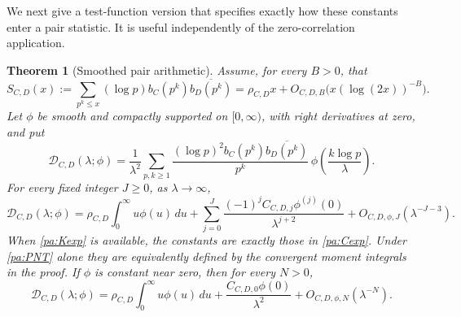 \documentclass[11pt,reqno]{amsart}
\numberwithin{equation}{section}
\newtheorem{theorem}{Theorem}[section]
\theoremstyle{definition}
\theoremstyle{remark}
\begin{document}
We next give a test-function version that specifies exactly how these constants enter a pair statistic. It is useful independently of the zero-correlation application.

\begin{theorem}[Smoothed pair arithmetic]\label{pa:smooth}
Assume, for every $B>0$, that
\begin{equation}S_{C,D}(x):=\sum_{p^k\le x}(\log p)b_C(p^k)\overline{b_D(p^k)}
=\rho_{C,D}x+O_{C,D,B}\bigl(x(\log(2x))^{-B}\bigr).\label{pa:PNT}\end{equation}
Let $\phi$ be smooth and compactly supported on $[0,\infty)$, with right derivatives at zero, and put
\begin{equation}\mathcal D_{C,D}(\lambda;\phi)=\frac1{\lambda^2}\sum_{p,k\ge1}
\frac{(\log p)^2b_C(p^k)\overline{b_D(p^k)}}{p^k}\,
\phi\left(\frac{k\log p}{\lambda}\right).\label{pa:D}\end{equation}
For every fixed integer $J\ge0$, as $\lambda\to\infty$,
\begin{equation}\mathcal D_{C,D}(\lambda;\phi)
=\rho_{C,D}\int_0^\infty u\phi(u)\,du+
\sum_{j=0}^{J}\frac{(-1)^j C_{C,D,j}\phi^{(j)}(0)}{\lambda^{j+2}}
+O_{C,D,\phi,J}(\lambda^{-J-3}).\label{pa:Dexp}\end{equation}
When \eqref{pa:Kexp} is available, the constants are exactly those in \eqref{pa:Cexp}. Under \eqref{pa:PNT} alone they are equivalently defined by the convergent moment integrals in the proof. If $\phi$ is constant near zero, then for every $N>0$,
\begin{equation}\mathcal D_{C,D}(\lambda;\phi)
=\rho_{C,D}\int_0^\infty u\phi(u)\,du+
\frac{C_{C,D,0}\phi(0)}{\lambda^2}+O_{C,D,\phi,N}(\lambda^{-N}).\label{pa:plateau}\end{equation}
\end{theorem}
\end{document}
